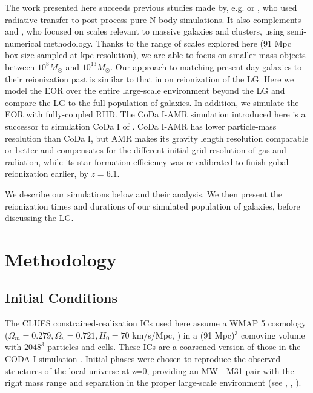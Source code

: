 \documentclass[twocolumn]{aastex61}
\begin{document}
The work presented here succeeds previous studies made by, e.g. \citet{WEI07} or \citet{DIX17}, who used radiative transfer to post-process pure N-body simulations. It also complements \citet{ALV9} and \citet{LI14}, who focused on scales relevant to massive galaxies and clusters, using semi-numerical methodology. Thanks to the range of scales 
explored here (91 Mpc box-size sampled at kpc resolution), we are able to focus on smaller-mass objects between $10^8 M_\odot$ and $10^{13} M_\odot$. 
Our approach to matching present-day galaxies to their reionization past is similar to that in \citet{OCV14} on reionization of the LG. %
Here we model the EOR over the entire large-scale environment beyond the LG and compare the LG to the full population of galaxies. In addition, we simulate the EOR with fully-coupled RHD.  The CoDa I-AMR simulation introduced here is a successor to simulation CoDa I of \citep{OCV16}. %
CoDa I-AMR has lower particle-mass resolution than CoDa I, but AMR makes its gravity length resolution comparable or better and compensates for the different initial grid-resolution of gas and radiation, while its star formation efficiency was re-calibrated to finish gobal reionization earlier, by $z = 6.1$.   

We describe our simulations below and their analysis. 
We then present the reionization times and durations of our simulated population of galaxies, before discussing the LG. 

\section{Methodology}

\subsection{Initial Conditions}

The CLUES constrained-realization ICs used here assume a WMAP 5 cosmology ($\Omega_m=0.279, \Omega_v=0.721, H_0=70$ km/s/Mpc, \citet{HIN9}) in a (91 Mpc)$^3$%
comoving volume with $2048^3$ particles and cells. These ICs are a coarsened version of those in the CODA I simulation \citep{OCV16}. Initial phases were chosen to reproduce the observed structures of the local universe at z=0, providing an MW - M31 pair with the right mass range and separation in the proper large-scale environment (see \citet{GOT10}, \citet{ILI11}, \citet{FR11}). 
\end{document}
